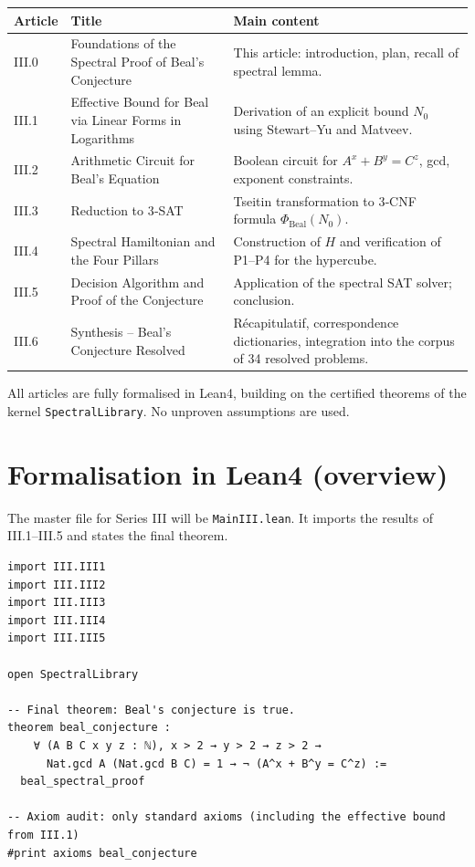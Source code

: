 \documentclass[11pt,a4paper]{article}
\begin{document}
\begin{center}
\begin{tabular}{@{}llp{8cm}@{}}
\toprule
\textbf{Article} & \textbf{Title} & \textbf{Main content} \\
\midrule
III.0 & Foundations of the Spectral Proof of Beal's Conjecture & This article: introduction, plan, recall of spectral lemma. \\
III.1 & Effective Bound for Beal via Linear Forms in Logarithms & Derivation of an explicit bound \(N_0\) using Stewart–Yu and Matveev. \\
III.2 & Arithmetic Circuit for Beal's Equation & Boolean circuit for \(A^x+B^y=C^z\), gcd, exponent constraints. \\
III.3 & Reduction to 3‑SAT & Tseitin transformation to 3‑CNF formula \(\Phi_{\text{Beal}}(N_0)\). \\
III.4 & Spectral Hamiltonian and the Four Pillars & Construction of \(H\) and verification of P1–P4 for the hypercube. \\
III.5 & Decision Algorithm and Proof of the Conjecture & Application of the spectral SAT solver; conclusion. \\
III.6 & Synthesis – Beal's Conjecture Resolved & Récapitulatif, correspondence dictionaries, integration into the corpus of 34 resolved problems. \\
\bottomrule
\end{tabular}
\end{center}

All articles are fully formalised in Lean4, building on the certified theorems of the kernel \texttt{SpectralLibrary}. No unproven assumptions are used.

\section{Formalisation in Lean4 (overview)}

The master file for Series III will be \texttt{MainIII.lean}. It imports the results of III.1–III.5 and states the final theorem.

\begin{lstlisting}[style=lean, caption={MainIII.lean (sketch)}]
import III.III1
import III.III2
import III.III3
import III.III4
import III.III5

open SpectralLibrary

-- Final theorem: Beal's conjecture is true.
theorem beal_conjecture :
    ∀ (A B C x y z : ℕ), x > 2 → y > 2 → z > 2 →
      Nat.gcd A (Nat.gcd B C) = 1 → ¬ (A^x + B^y = C^z) :=
  beal_spectral_proof

-- Axiom audit: only standard axioms (including the effective bound from III.1)
#print axioms beal_conjecture
\end{lstlisting}
\end{document}
